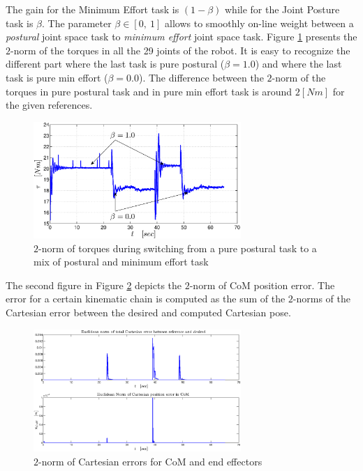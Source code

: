 The gain for the Minimum Effort task is $\left( 1 - \beta \right)$ while for the Joint Posture task is $\beta$. The parameter $\beta \in [0, \ 1]$ allows to smoothly on-line weight between a \emph{postural} joint space task to \emph{minimum effort} joint space task. Figure \ref{effort} presents the $2$-norm of the torques in all the 29 joints of the robot. It is easy to recognize the different part where the last task is pure postural ($\beta = 1.0$) and where the last task is pure min effort ($\beta = 0.0$). The difference between the $2$-norm of the torques in pure postural task and in pure min effort task is around $2 [Nm]$ for the given references. 
\begin{figure}
  \centering
    \vspace*{0.05in}
    \includegraphics[width=0.7\textwidth]{images/soft_interaction/effort}
    \caption{$2$-norm of torques during switching from a pure postural task to a mix of postural and minimum effort task}\label{effort}
\end{figure} 
The second figure in Figure \ref{CoM_error} depicts the $2$-norm of CoM position error. The error for a certain kinematic chain is computed as the sum of the $2$-norms of the Cartesian error between the desired and computed Cartesian pose.
\begin{figure}
    \centering
    \includegraphics[width=0.7\textwidth]{images/soft_interaction/CartesianErrors}
    \caption{$2$-norm of Cartesian errors for CoM and end effectors}\label{CoM_error}
\end{figure}
